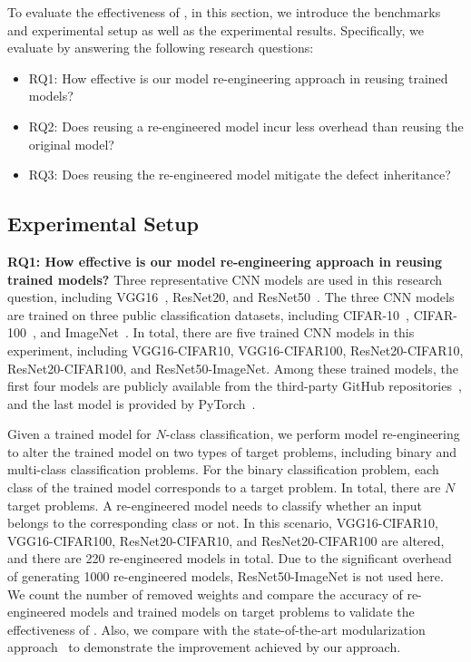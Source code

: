 To evaluate the effectiveness of \projectName, in this section, we introduce the benchmarks and experimental setup as well as the experimental results.
Specifically, we evaluate \projectName by answering the following research questions:
\begin{itemize}[leftmargin=*]
    \item RQ1: How effective is our model re-engineering approach in reusing trained models?
    \item RQ2: Does reusing a re-engineered model incur less overhead than reusing the original model?
    \item RQ3: Does reusing the re-engineered model mitigate the defect inheritance? %

\end{itemize}

\subsection{Experimental Setup}
\label{subsec:setup}
\noindent \textbf{RQ1: How effective is our model re-engineering approach in reusing trained models?} Three representative CNN models are used in this research question, including VGG16~\cite{vgg}, ResNet20, and ResNet50~\cite{resnet}. 
The three CNN models are trained on three public classification datasets, including CIFAR-10~\cite{cifar10}, CIFAR-100~\cite{cifar10}, and ImageNet~\cite{imagenet}.
In total, there are five trained CNN models in this experiment, including VGG16-CIFAR10, VGG16-CIFAR100, ResNet20-CIFAR10, ResNet20-CIFAR100, and ResNet50-ImageNet. Among these trained models, the first four models are publicly available from the third-party GitHub repositories~\cite{cifarmodel}, and the last model is provided by PyTorch~\cite{pytorchmodel}.

Given a trained model for $N$-class classification, we perform model re-engineering to alter the trained model on two types of target problems, including binary and multi-class classification problems.
For the binary classification problem, each class of the trained model corresponds to a target problem. In total, there are $N$ target problems. A re-engineered model needs to classify whether an input belongs to the corresponding class or not.
In this scenario, VGG16-CIFAR10, VGG16-CIFAR100, ResNet20-CIFAR10, and ResNet20-CIFAR100
are altered, and there are 220 re-engineered models in total.
Due to the significant overhead of generating 1000 re-engineered models, ResNet50-ImageNet is not used here.
We count the number of removed weights and compare the accuracy of re-engineered models and trained models on target problems to validate the effectiveness of \projectName. 
Also, we compare \projectName with the state-of-the-art modularization approach~\cite{nnmodularity2022icse} to demonstrate the improvement achieved by our approach.

